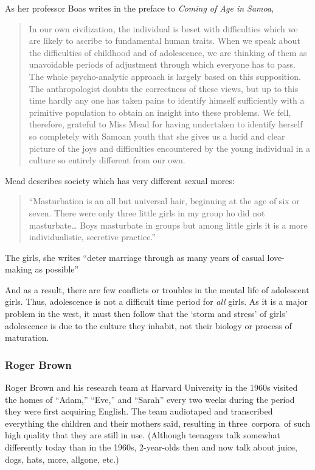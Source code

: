 \begin{refsection}
As her professor Boas writes in the preface to \emph{Coming of Age in Samoa}, 

\begin{quote}

In our own civilization, the individual is beset with difficulties which we are likely to ascribe to fundamental human traits. When we speak about the difficulties of childhood and of adolescence, we are thinking of them as unavoidable periods of adjustment through which everyone has to pass. The whole psycho-analytic approach is largely based on this supposition.
The anthropologist doubts the correctness of these views, but up to this time hardly any one has taken pains to identify himself sufficiently with a primitive population to obtain an insight into these problems. We fell, therefore, grateful to Miss Mead for having undertaken to identify herself so completely with Samoan youth that she gives us a lucid and clear picture of the joys and difficulties encountered by the young individual in a culture so entirely different from our own. ~\citep{Mead:1928uk}
\end{quote}

Mead describes society which has very different sexual mores: 

\begin{quote}

“Masturbation is an all but universal hair, beginning at the age of six or seven. There were only three little girls in my group ho did not masturbate{\ldots} Boys masturbate in groups but among little girls it is a more individualistic, secretive practice.” ~\citep[p. 136]{Mead:1928uk} 
\end{quote}

The girls, she writes “deter marriage through as many years of casual love-making as possible” ~\citep[p. 195]{Mead:1928uk}

And as a result, there are few conflicts or troubles in the mental life of adolescent girls. Thus, adolescence is not a difficult time period for \emph{all} girls. As it is a major problem in the west, it must then follow that the ‘storm and stress’ of girls’ adolescence is due to the culture they inhabit, not their biology or process of maturation.

\subsubsection{Roger Brown}
\label{rogerbrown}

Roger Brown and his research team at Harvard University in the 1960s visited the homes of “Adam,” “Eve,” and “Sarah” every two weeks during the period they were first acquiring English. The team audiotaped and transcribed everything the children and their mothers said, resulting in three corpora of such high quality that they are still in use. (Although teenagers talk somewhat differently today than in the 1960s, 2-year-olds then and now talk about juice, dogs, hats, more, allgone, etc.) 


\end{refsection}
